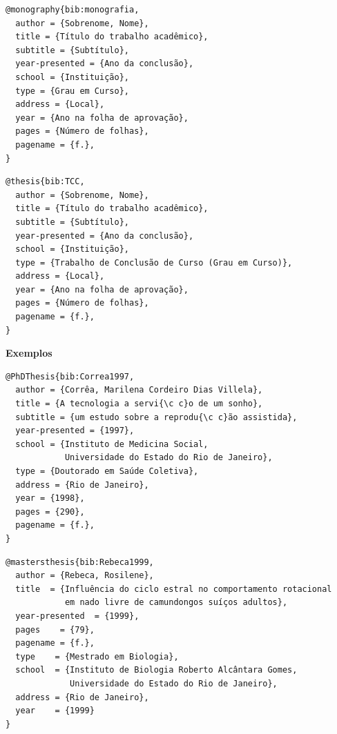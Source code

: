 \documentclass[a4paper,12pt,oneside,onecolumn,final,fleqn]{repUERJ}
\begin{document}
\noindent{}

\begin{verbatim}
@monography{bib:monografia,
  author = {Sobrenome, Nome},
  title = {Título do trabalho acadêmico},
  subtitle = {Subtítulo},
  year-presented = {Ano da conclusão},
  school = {Instituição},
  type = {Grau em Curso},
  address = {Local},
  year = {Ano na folha de aprovação},
  pages = {Número de folhas},
  pagename = {f.},
}
\end{verbatim}

\noindent{}

\begin{verbatim}
@thesis{bib:TCC,
  author = {Sobrenome, Nome},
  title = {Título do trabalho acadêmico},
  subtitle = {Subtítulo},
  year-presented = {Ano da conclusão},
  school = {Instituição},
  type = {Trabalho de Conclusão de Curso (Grau em Curso)},
  address = {Local},
  year = {Ano na folha de aprovação},
  pages = {Número de folhas},
  pagename = {f.},
}
\end{verbatim}

\noindent\textbf{Exemplos}\\

\noindent{}

\begin{verbatim}
@PhDThesis{bib:Correa1997,
  author = {Corrêa, Marilena Cordeiro Dias Villela},
  title = {A tecnologia a servi{\c c}o de um sonho},
  subtitle = {um estudo sobre a reprodu{\c c}ão assistida},
  year-presented = {1997},
  school = {Instituto de Medicina Social,
            Universidade do Estado do Rio de Janeiro},
  type = {Doutorado em Saúde Coletiva},
  address = {Rio de Janeiro},
  year = {1998},
  pages = {290},
  pagename = {f.},
}
\end{verbatim}

\noindent{}

\begin{verbatim}
@mastersthesis{bib:Rebeca1999,
  author = {Rebeca, Rosilene},
  title  = {Influência do ciclo estral no comportamento rotacional 
            em nado livre de camundongos suíços adultos},
  year-presented  = {1999},
  pages    = {79},
  pagename = {f.},
  type    = {Mestrado em Biologia},
  school  = {Instituto de Biologia Roberto Alcântara Gomes,
             Universidade do Estado do Rio de Janeiro},
  address = {Rio de Janeiro},
  year    = {1999}
}
\end{verbatim}
\end{document}
